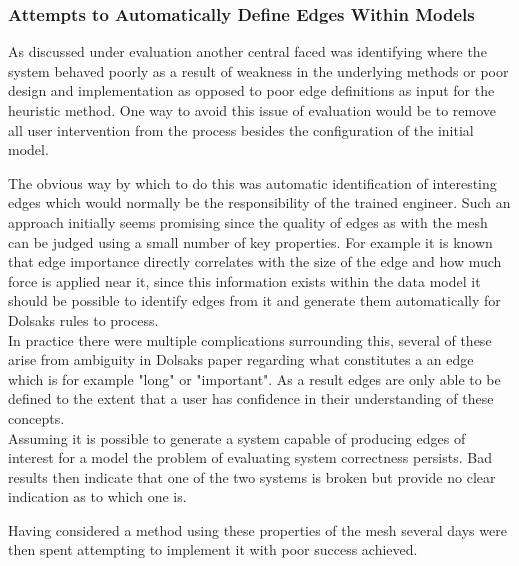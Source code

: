 \subsubsection{Attempts to Automatically Define Edges Within Models}
As discussed under evaluation another central faced was identifying where the system behaved poorly as a result of weakness in the underlying methods or poor design and implementation  as opposed to poor edge definitions as input for the heuristic method. One way to avoid this issue of evaluation would be to remove all user intervention from the process besides the configuration of the initial model.

\noindent
The obvious way by which to do this was automatic identification of interesting edges which would normally be the responsibility of the trained engineer. Such an approach initially seems promising since the quality of edges as with the mesh can be judged using a small number of key properties. For example it is known that edge importance directly correlates with the size of the edge and how much force is applied near it, since this information exists within the data model it should be possible to identify edges from it and generate them automatically for Dolsaks rules to process.  \\

\noindent
In practice there were multiple complications surrounding this, several of these arise from ambiguity in Dolsaks paper regarding what constitutes a an edge which is for example "long" or "important". As a result edges are only able to be defined to the extent that a user has confidence in their understanding of these concepts. \\ 

Assuming it is possible to generate a system capable of producing edges of interest for a model the problem of evaluating system correctness persists. Bad results then indicate that one of the two systems is broken but provide no clear indication as to which one is.


Having considered a method using these properties of the mesh several days were then spent attempting to implement it with poor success achieved.
